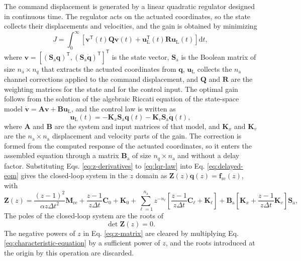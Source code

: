 \documentclass[11pt,a4paper]{article}
\numberwithin{equation}{section}
\begin{document}
The command displacement is generated by a linear quadratic regulator designed in continuous time. The regulator acts on the actuated coordinates, so the state collects their displacements and velocities, and the gain is obtained by minimizing
\begin{equation}
	J=\int_{0}^{\infty}
	\left[
	\bm{v}^{\mathsf{T}}(t)\mathbf{Q}\bm{v}(t)
	+\bm{u}_{\mathrm{L}}^{\mathsf{T}}(t)\mathbf{R}\bm{u}_{\mathrm{L}}(t)
	\right]\mathrm{d}t,
	\label{eq:lqr-cost}
\end{equation}
where \(\bm{v}=[(\mathbf{S}_{\mathrm{a}}\bm{q})^{\mathsf{T}},(\mathbf{S}_{\mathrm{a}}\dot{\bm{q}})^{\mathsf{T}}]^{\mathsf{T}}\) is the state vector, \(\mathbf{S}_{\mathrm{a}}\) is the Boolean matrix of size \(n_{\mathrm{a}}\times n_{q}\) that extracts the actuated coordinates from \(\bm{q}\), \(\bm{u}_{\mathrm{L}}\) collects the \(n_{\mathrm{a}}\) channel corrections applied to the command displacement, and \(\mathbf{Q}\) and \(\mathbf{R}\) are the weighting matrices for the state and for the control input. The optimal gain follows from the solution of the algebraic Riccati equation of the state-space model \(\dot{\bm{v}}=\mathbf{A}\bm{v}+\mathbf{B}\bm{u}_{\mathrm{L}}\), and the control law is written as
\begin{equation}
	\bm{u}_{\mathrm{L}}(t)=
	-\mathbf{K}_{x}\mathbf{S}_{\mathrm{a}}\bm{q}(t)
	-\mathbf{K}_{v}\mathbf{S}_{\mathrm{a}}\dot{\bm{q}}(t),
	\label{eq:lqr-law}
\end{equation}
where \(\mathbf{A}\) and \(\mathbf{B}\) are the system and input matrices of that model, and \(\mathbf{K}_{x}\) and \(\mathbf{K}_{v}\) are the \(n_{\mathrm{a}}\times n_{\mathrm{a}}\) displacement and velocity parts of the gain. The correction is formed from the computed response of the actuated coordinates, so it enters the assembled equation through a matrix \(\mathbf{B}_{\mathrm{a}}\) of size \(n_{q}\times n_{\mathrm{a}}\) and without a delay factor.
Substituting Eqs. \eqref{eq:z-derivatives} to \eqref{eq:lqr-law} into Eq. \eqref{eq:delayed-eom} gives the closed-loop system in the \(z\) domain as \(\mathbf{Z}(z)\bm{q}(z)=\bm{f}_{\mathrm{re}}(z)\), with
\begin{equation}
	\mathbf{Z}(z)=
	\frac{(z-1)^{2}}{\alpha z\Delta t^{2}}\mathbf{M}_{\mathrm{re}}
	+\frac{z-1}{z\Delta t}\mathbf{C}_{0}+\mathbf{K}_{0}
	+\sum_{\ell=1}^{n_{\mathrm{a}}}z^{-n_{\ell}}
	\left[
	\frac{z-1}{z\Delta t}\mathbf{C}_{\ell}+\mathbf{K}_{\ell}
	\right]
	+\mathbf{B}_{\mathrm{a}}
	\left[
	\mathbf{K}_{x}+\frac{z-1}{z\Delta t}\mathbf{K}_{v}
	\right]\mathbf{S}_{\mathrm{a}},
	\label{eq:z-matrix}
\end{equation}
The poles of the closed-loop system are the roots of
\begin{equation}
	\det\mathbf{Z}(z)=0.
	\label{eq:characteristic-equation}
\end{equation}
The negative powers of \(z\) in Eq. \eqref{eq:z-matrix} are cleared by multiplying Eq. \eqref{eq:characteristic-equation} by a sufficient power of \(z\), and the roots introduced at the origin by this operation are discarded.
\end{document}
